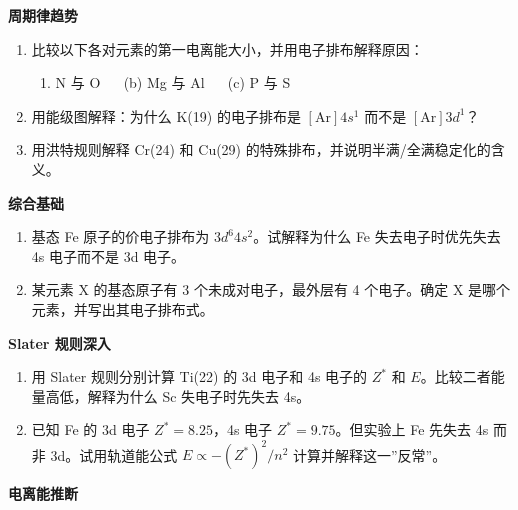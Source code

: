 \documentclass[a4paper,11pt]{ctexart}
\providecommand{\tightlist}{\setlength{\itemsep}{0pt}\setlength{\parskip}{0pt}}
\newcommand{\箭}{\ensuremath{\rightarrow}}
\newcommand{\左箭}{\ensuremath{\leftarrow}}
\newcommand{\上箭}{\ensuremath{\uparrow}}
\newcommand{\下箭}{\ensuremath{\downarrow}}
\newcommand{\衡}{\ensuremath{\rightleftharpoons}}
\newcommand{\双箭}{\ensuremath{\leftrightarrow}}
\newcommand{\约等于}{\ensuremath{\approx}}
\newcommand{\小于等于}{\ensuremath{\leq}}
\newcommand{\大于等于}{\ensuremath{\geq}}
\newcommand{\不等于}{\ensuremath{\neq}}
\newcommand{\西格马}{\ensuremath{\sigma}}
\newcommand{\派}{\ensuremath{\pi}}
\begin{document}
\textbf{周期律趋势}

\begin{enumerate}
\def\labelenumi{\arabic{enumi}.}
\setcounter{enumi}{8}
\item
  比较以下各对元素的第一电离能大小，并用电子排布解释原因：

  \begin{enumerate}
  \def\labelenumii{(\alph{enumii})}
  \tightlist
  \item
    N 与 O   (b) Mg 与 Al   (c) P 与 S
  \end{enumerate}
\item
  用能级图解释：为什么 K(19) 的电子排布是 \([\mathrm{Ar}]4s^1\) 而不是 \([\mathrm{Ar}]3d^1\)？
\item
  用洪特规则解释 Cr(24) 和 Cu(29) 的特殊排布，并说明半满/全满稳定化的含义。
\end{enumerate}

\textbf{综合基础}

\begin{enumerate}
\def\labelenumi{\arabic{enumi}.}
\setcounter{enumi}{11}
\item
  基态 Fe 原子的价电子排布为 \(3d^6 4s^2\)。试解释为什么 Fe 失去电子时优先失去 4s 电子而不是 3d 电子。
\item
  某元素 X 的基态原子有 3 个未成对电子，最外层有 4 个电子。确定 X 是哪个元素，并写出其电子排布式。
\end{enumerate}

\textbf{Slater 规则深入}

\begin{enumerate}
\def\labelenumi{\arabic{enumi}.}
\setcounter{enumi}{13}
\item
  用 Slater 规则分别计算 Ti(22) 的 3d 电子和 4s 电子的 \(Z^*\) 和 \(E\)。比较二者能量高低，解释为什么 Sc 失电子时先失去 4s。
\item
  已知 Fe 的 3d 电子 \(Z^* = 8.25\)，4s 电子 \(Z^* = 9.75\)。但实验上 Fe 先失去 4s 而非 3d。试用轨道能公式 \(E \propto -(Z^*)^2/n^2\) 计算并解释这一''反常''。
\end{enumerate}

\textbf{电离能推断}
\end{document}
